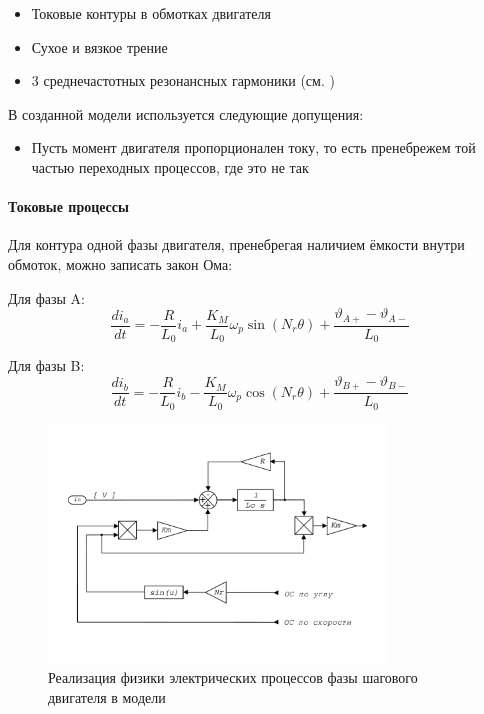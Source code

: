 \begin{itemize}
    \item Токовые контуры в обмотках двигателя
    \item Сухое и вязкое трение
    \item 3 среднечастотных резонансных гармоники (см. \cite{Novel_Modeling_and_Damping})
\end{itemize}

В созданной модели используется следующие допущения:

\begin{itemize}
    \item Пусть момент двигателя пропорционален току, то есть пренебрежем той частью переходных
            процессов, где это не так
\end{itemize}

\paragraph{ Токовые процессы }
Для контура одной фазы двигателя, пренебрегая наличием ёмкости внутри обмоток, можно записать
закон Ома:

Для фазы A:
\begin{equation}
    \frac{di_{a}}{dt} =
        - \frac{R}{L_{0}} i_{a}
        + \frac{K_{M}}{L_{0}} \omega_{p} \sin(N_{r}\theta)
        + \frac{\vartheta_{A+} - \vartheta_{A-}}{L_{0}}
\end{equation}

Для фазы B:
\begin{equation}
    \frac{di_{b}}{dt} =
        - \frac{R}{L_{0}} i_{b}
        - \frac{K_{M}}{L_{0}} \omega_{p} \cos(N_{r}\theta)
        + \frac{\vartheta_{B+} - \vartheta_{B-}}{L_{0}}
\end{equation}
\begin{figure}[ht!]
    \centering
    \includegraphics[width=0.8\textwidth, keepaspectratio]
                    {./src/pictures/drive_model/drive_model_current_equation}
    \caption{Реализация физики электрических процессов фазы шагового двигателя в модели}
    \label{pic_drive_model_current_equation}
\end{figure}

